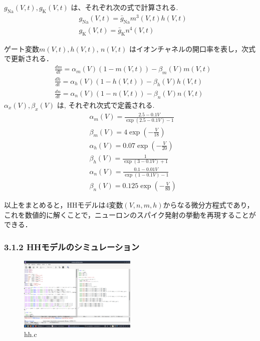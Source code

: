 \documentclass[dvipdfmx, A4j, twocolumn, 10.5pt]{jsarticle}
\begin{document}
$g_{\mathrm{Na}}(V, t), g_{\mathrm{K}}(V, t)$ は、それぞれ次の式で計算される.
$$
\begin{aligned}
& g_{\mathrm{Na}}(V, t)=\bar{g}_{\mathrm{Na}} m^3(V, t) h(V, t) \\
& g_{\mathrm{K}}(V, t)=\bar{g}_{\mathrm{K}} n^4(V, t)
\end{aligned}
$$


ゲート変数$m(V, t), h(V, t)$, $n(V, t)$ はイオンチャネルの開口率を表し，次式で更新される．
$$
\begin{aligned}
& \frac{d m}{d t}=\alpha_m(V)(1-m(V, t))-\beta_m(V) m(V, t) \\
& \frac{d h}{d t}=\alpha_h(V)(1-h(V, t))-\beta_h(V) h(V, t) \\
& \frac{d n}{d t}=\alpha_n(V)(1-n(V, t))-\beta_n(V) n(V, t)
\end{aligned}
$$
$\alpha_x(V), \beta_x(V)$ は, それぞれ次式で定義される.
$$
\begin{aligned}
& \alpha_m(V)=\frac{2.5-0.1 V}{\exp (2.5-0.1 V)-1} \\
& \beta_m(V)=4 \exp \left(-\frac{V}{18}\right) \\
& \alpha_h(V)=0.07 \exp \left(-\frac{V}{20}\right) \\
& \beta_h(V)=\frac{1}{\exp (3-0.1 V)+1} \\
& \alpha_n(V)=\frac{0.1-0.01 V}{\exp (1-0.1 V)-1} \\
& \beta_n(V)=0.125 \exp \left(-\frac{V}{80}\right)
\end{aligned}
$$

以上をまとめると，HHモデルは4変数$(V,n,m,h)$からなる微分方程式であり，これを数値的に解くことで，ニューロンのスパイク発射の挙動を再現することができる．

\vspace{\baselineskip}

\subsubsection*{3.1.2 HHモデルのシミュレーション}




\begin{figure}[h]
    \centering
    \includegraphics[width=0.5\textwidth]{images/hh_code.png}
    \caption{hh.c}
\end{figure}
\end{document}
